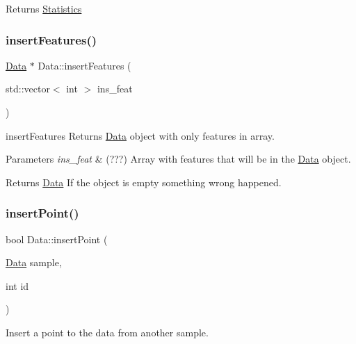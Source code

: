 \begin{DoxyReturn}{Returns}
\hyperlink{class_statistics}{Statistics} 
\end{DoxyReturn}
\mbox{\label{class_data_a5eb92a397e4eafb02f3c012658c78b37}} 
\subsubsection{\texorpdfstring{insert\+Features()}{insertFeatures()}}
{\footnotesize\ttfamily \hyperlink{class_data}{Data} $\ast$ Data\+::insert\+Features (\begin{DoxyParamCaption}\item[{std\+::vector$<$ int $>$}]{ins\+\_\+feat }\end{DoxyParamCaption})}



insert\+Features Returns \hyperlink{class_data}{Data} object with only features in array. 


\begin{DoxyParams}{Parameters}
{\em ins\+\_\+feat} & (???) Array with features that will be in the \hyperlink{class_data}{Data} object. \\
\hline
\end{DoxyParams}
\begin{DoxyReturn}{Returns}
\hyperlink{class_data}{Data} If the object is empty something wrong happened. 
\end{DoxyReturn}
\mbox{\label{class_data_abb6aade47d78a284301c32e82b2cbee2}} 
\subsubsection{\texorpdfstring{insert\+Point()}{insertPoint()}\hspace{0.1cm}{\footnotesize\ttfamily [1/2]}}
{\footnotesize\ttfamily bool Data\+::insert\+Point (\begin{DoxyParamCaption}\item[{\hyperlink{class_data}{Data}}]{sample,  }\item[{int}]{id }\end{DoxyParamCaption})}



Insert a point to the data from another sample. 


